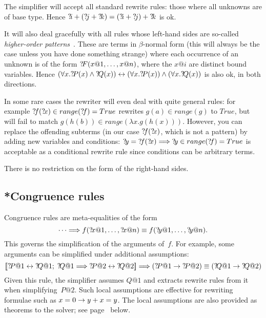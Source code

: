 \begin{warn}
The simplifier will accept all standard rewrite rules: those
where all unknowns are of base type.  Hence ${{?\!i}+({?\!j}+{?\!k})} =
{({?\!i}+{?\!j})+{?\!k}}$ is ok.

It will also deal gracefully with all rules whose left-hand sides are
so-called {\em higher-order patterns}~\cite{nipkow-patterns}.
These are terms in $\beta$-normal form (this will always be the case unless
you have done something strange) where each occurrence of an unknown is of
the form ${?\!F}(x@1,\dots,x@n)$, where the $x@i$ are distinct bound
variables. Hence $(\forall x.{?\!P}(x) \land {?\!Q}(x)) \leftrightarrow (\forall
x.{?\!P}(x)) \land (\forall x.{?\!Q}(x))$ is also ok, in both directions.

In some rare cases the rewriter will even deal with quite general rules: for
example ${{?\!f}({?\!x})\in range({?\!f})} = True$ rewrites $g(a) \in
range(g)$ to $True$, but will fail to match $g(h(b)) \in range(\lambda
x.g(h(x)))$.  However, you can replace the offending subterms (in our case
${?\!f}({?\!x})$, which is not a pattern) by adding new variables and
conditions: ${?\!y} = {?\!f}({?\!x}) \Longrightarrow {?\!y}\in range({?\!f})
= True$ is acceptable as a conditional rewrite rule since conditions can
be arbitrary terms.

There is no restriction on the form of the right-hand sides.
\end{warn}


\subsection{*Congruence rules}
Congruence rules are meta-equalities of the form
\[ \dots \Longrightarrow
   f({?\!x@1},\ldots,{?\!x@n}) \equiv f({?\!y@1},\ldots,{?\!y@n}).
\]
This governs the simplification of the arguments of~$f$.  For
example, some arguments can be simplified under additional assumptions:
\[ \List{\Var{P@1} \bimp \Var{Q@1};\; \Var{Q@1} \Imp \Var{P@2} \bimp \Var{Q@2}}
   \Imp (\Var{P@1} \imp \Var{P@2}) \equiv (\Var{Q@1} \imp \Var{Q@2})
\]
Given this rule, the simplifier assumes $Q@1$ and extracts rewrite rules
from it when simplifying~$P@2$.  Such local assumptions are effective for
rewriting formulae such as $x=0\rightarrow y+x=y$.  The local assumptions are also
provided as theorems to the solver; see page~\pageref{sec:simp-solver} below.

